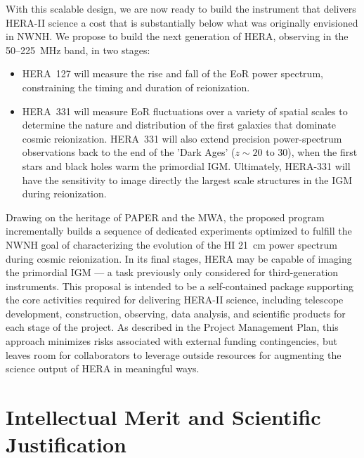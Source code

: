 \documentclass[preprint]{aastex}
\begin{document}
With this scalable design, we are now ready to build the instrument
that delivers HERA-II science
a cost that is substantially below what was originally envisioned in NWNH.
We propose to build the next generation of HERA,
observing in the 50--225~MHz band, in two stages:
\begin{itemize}[noitemsep,nolistsep]

\item HERA~127 will measure the rise and fall of the EoR power
spectrum, constraining the timing and duration of reionization.

\item HERA~331 will measure EoR fluctuations over a variety of spatial
scales to determine the nature and distribution of the first galaxies
that dominate cosmic reionization. HERA~331 will also extend precision
power-spectrum observations back to the end of the 'Dark Ages' ($z \sim 20$
to 30), when the first stars and black holes warm the primordial IGM. Ultimately,
HERA-331 will have the sensitivity to
image directly the largest scale structures in the IGM during reionization.
\end{itemize}
Drawing on the heritage of PAPER and the MWA, the proposed program incrementally builds a 
sequence of dedicated experiments
optimized to fulfill the NWNH goal of characterizing the evolution of
the HI 21~cm power spectrum during cosmic reionization. In
its final stages, HERA may be capable of imaging the primordial
IGM --- a task previously only considered for third-generation
instruments. This proposal is intended to be a self-contained package
supporting the core activities required for delivering HERA-II science,
including telescope development, construction, observing, data analysis,
and scientific products for each stage of the project.  As described
in the Project Management Plan, this approach minimizes
risks associated with external funding contingencies, but leaves room for
collaborators to leverage outside resources for augmenting the science
output of HERA in meaningful ways.



\section{Intellectual Merit and Scientific Justification} %
\end{document}
